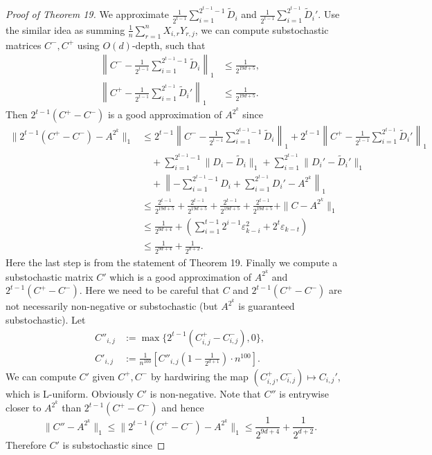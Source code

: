 \begin{proof}[Proof of Theorem 19]
We approximate $\frac1{2^{t-1}}\sum_{i=1}^{2^{t-1}-1}\widetilde D_i$ and $\frac1{2^{t-1}}\sum_{i=1}^{2^{t-1}}\widetilde D_i'$. Use the similar idea as summing $\frac1n\sum_{r=1}^n X_{i,r}Y_{r,j}$, we can compute substochastic matrices $C^-,C^+$ using $O(d)$-depth, such that
\begin{align*}\left\|C^--\frac1{2^{t-1}}\sum_{i=1}^{2^{t-1}-1}\widetilde D_i\right\|_1&\le\frac1{2^{19d+5}},\\\left\|C^+-\frac1{2^{t-1}}\sum_{i=1}^{2^{t-1}}\widetilde D_i'\right\|_1&\le\frac1{2^{19d+5}}.\end{align*}
Then $2^{t-1}(C^+-C^-)$ is a good approximation of $A^{2^k}$ since
\begin{align*}\|2^{t-1}(C^+-C^-)-A^{2^k}\|_1&\le2^{t-1}\left\|C^--\frac1{2^{t-1}}\sum_{i=1}^{2^{t-1}-1}\widetilde D_i\right\|_1+2^{t-1}\left\|C^+-\frac1{2^{t-1}}\sum_{i=1}^{2^{t-1}}\widetilde D_i'\right\|_1\\&\quad+\sum_{i=1}^{2^{t-1}-1}\|D_i-\widetilde D_i\|_1+\sum_{i=1}^{2^{t-1}}\|D_i'-\widetilde D_i'\|_1\\&\quad+\left\|-\sum_{i=1}^{2^{t-1}-1}D_i+\sum_{i=1}^{2^{t-1}}D_i'-A^{2^k}\right\|_1\\&\le\frac{2^{t-1}}{2^{19d+5}}+\frac{2^{t-1}}{2^{19d+5}}+\frac{2^{t-1}}{2^{19d+5}}+\frac{2^{t-1}}{2^{19d+5}}+\|C-A^{2^k}\|_1\\&\le\frac1{2^{9d+4}}+\left(\sum_{i=1}^{t-1}2^{i-1}\varepsilon_{k-i}^2+2^t\varepsilon_{k-t}\right)\\&\le\frac1{2^{9d+4}}+\frac1{2^{d+2}}.\end{align*}
Here the last step is from the statement of Theorem 19.
Finally we compute a substochastic matrix $C'$ which is a good approximation of $A^{2^k}$ and $2^{t-1}(C^+-C^-)$. Here we need to be careful that $C$ and $2^{t-1}(C^+-C^-)$ are not necessarily non-negative or substochastic (but $A^{2^k}$ is guaranteed substochastic). Let
\begin{align*}C''_{i,j}&:=\max\{2^{t-1}(C_{i,j}^+-C_{i,j}^-),0\},\\C'_{i,j}&:=\frac1{n^{100}}\left[C''_{i,j}\left(1-\frac1{2^{d+1}}\right)\cdot n^{100}\right].\end{align*}
We can compute $C'$ given $C^+,C^-$ by hardwiring the map $(C_{i,j}^+,C_{i,j}^-)\mapsto C_{i,j}'$, which is L-uniform. Obviously $C'$ is non-negative. Note that $C''$ is entrywise closer to $A^{2^k}$ than $2^{t-1}(C^+-C^-)$ and hence
\[\|C''-A^{2^k}\|_1\le\|2^{t-1}(C^+-C^-)-A^{2^k}\|_1\le\frac1{2^{9d+4}}+\frac1{2^{d+2}}.\]
Therefore $C'$ is substochastic since

\end{proof}
